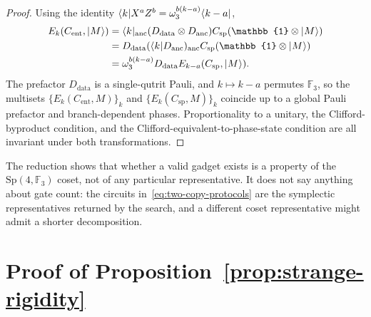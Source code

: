 \documentclass[11pt]{article}
\theoremstyle{definition}
\newcommand{\microspace}{\mspace{0.5mu}}
\newcommand{\ket}[1]{\lvert\microspace #1 \microspace \rangle}
\newcommand{\bra}[1]{\langle\microspace #1 \microspace \rvert}
\newcommand{\I}{\mathbb{1}}
\newcommand{\F}{\mathcal{F}}
\renewcommand{\F}[1]{\mathbb{F}_{#1}}
\newcommand{\Sp}{\mathrm{Sp}}
\begin{document}
	\begin{proof}
		Using the identity
		$\bra{k} X^{a} Z^{b} = \omega_3^{b(k - a)} \bra{k - a}$,
		\begin{equation}
			\begin{aligned}
				E_k(C_{\mathrm{ent}}, \ket{M})
				&= \bra{k}_{\mathrm{anc}} (D_{\mathrm{data}} \otimes D_{\mathrm{anc}})
				 C_{\mathrm{sp}} (\I \otimes \ket{M}) \\
				&= D_{\mathrm{data}} (\bra{k} D_{\mathrm{anc}})_{\mathrm{anc}}
				 C_{\mathrm{sp}} (\I \otimes \ket{M}) \\
				&= \omega_3^{b(k - a)} D_{\mathrm{data}} E_{k - a}(C_{\mathrm{sp}}, \ket{M}).
			\end{aligned}
		\end{equation}
		The prefactor $D_{\mathrm{data}}$ is a single-qutrit Pauli, and
		$k \mapsto k - a$ permutes $\F{3}$, so the multisets
		$\{E_k(C_{\mathrm{ent}}, M)\}_{k}$ and $\{E_k(C_{\mathrm{sp}},
		M)\}_{k}$ coincide up to a global Pauli prefactor and
		branch-dependent phases. Proportionality to a unitary, the
		Clifford-byproduct condition, and the
		Clifford-equivalent-to-phase-state condition are all invariant
		under both transformations.
	\end{proof}

	The reduction shows that whether a valid gadget exists is a
	property of the $\Sp(4, \F{3})$ coset, not of any particular
	representative. It does not say anything about gate count: the
	circuits in~\eqref{eq:two-copy-protocols} are the symplectic
	representatives returned by the search, and a different coset
	representative might admit a shorter decomposition.

	\section{Proof of Proposition~\ref{prop:strange-rigidity}}\label{app:strange-rigidity}
\end{document}
